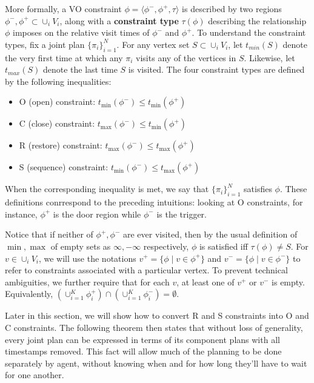 \documentclass[letterpaper]{article}
\begin{document}
More formally, a VO constraint $\phi = \langle\phi^-,\phi^+,\tau\rangle$ is described by two regions $\phi^-,\phi^+\subset \cup_i V_i$, along with a \textbf{constraint type} $\tau(\phi)$ describing the relationship $\phi$ imposes on the relative visit times of $\phi^-$ and $\phi^+$. To understand the constraint types, fix a joint plan $\{\pi_i\}_{i=1}^N$. For any vertex set $S \subset \cup_i V_i$, let $t_{min}(S)$ denote the very first time at which any $\pi_i$ visits any of the vertices in $S$. Likewise, let $t_{max}(S)$ denote the last time $S$ is visited. The four constraint types are defined by the following inequalities:

\begin{itemize}
\item O (open) constraint: $t_{\min}(\phi^-) \le t_{\min}(\phi^+)$
\item C (close) constraint: $t_{\max}(\phi^-) \le t_{\min}(\phi^+)$
\item R (restore) constraint: $t_{\max}(\phi^-) \le t_{\max}(\phi^+)$
\item S (sequence) constraint: $t_{\min}(\phi^-) \le t_{\max}(\phi^+)$
\end{itemize}

When the corresponding inequality is met, we say that $\{\pi_i\}_{i=1}^N$ satisfies $\phi$. These definitions conrrespond to the preceding intuitions: looking at O constraints, for instance, $\phi^+$ is the door region while $\phi^-$ is the trigger.

Notice that if neither of $\phi^+,\phi^-$ are ever visited, then by the usual definition of $\min,\max$ of empty sets as $\infty, -\infty$ respectively, $\phi$ is satisfied iff $\tau(\phi)\ne S$. For $v\in \cup_i V_i$, we will use the notations $v^+ = \{\phi \mid v\in\phi^+\}$ and $v^- = \{\phi \mid v\in\phi^-\}$ to refer to constraints associated with a particular vertex. To prevent technical ambiguities, we further require that for each $v$, at least one of $v^+$ or $v^-$ is empty. Equivalently, $(\cup_{i=1}^K \phi_i^+) \cap (\cup_{i=1}^K \phi_i^-) = \emptyset$.

Later in this section, we will show how to convert R and S constraints into O and C constraints. The following theorem then states that without loss of generality, every joint plan can be expressed in terms of its component plans with all timestamps removed. This fact will allow much of the planning to be done separately by agent, without knowing when and for how long they'll have to wait for one another.
\end{document}

